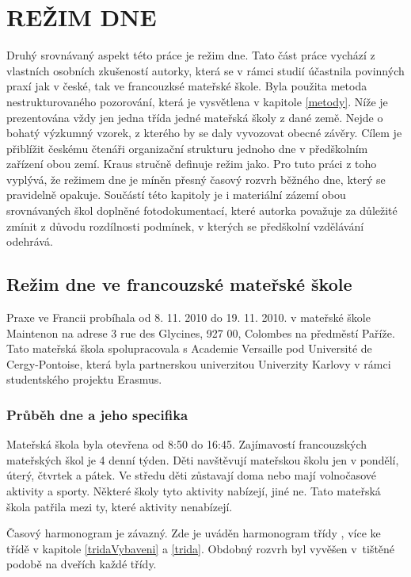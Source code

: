 \chapter{REŽIM DNE}
\label{rezim}

	Druhý srovnávaný aspekt této práce je režim dne. Tato část práce vychází z vlastních osobních zkušeností autorky, která se v rámci studií účastnila povinných praxí jak v české, tak ve francouzksé mateřské škole. Byla použita metoda nestrukturovaného pozorování, která je vysvětlena v kapitole \ref{metody}. Níže je prezentována vždy jen jedna třída jedné mateřská školy z dané země. Nejde o bohatý výzkumný vzorek, z kterého by se daly vyvozovat obecné závěry. Cílem je přiblížit českému čtenáři organizační strukturu jednoho dne v předškolním zařízení obou zemí. Kraus stručně definuje režim jako\textit{}. \citep[s.~700]{Kraus}
	Pro tuto práci z toho vyplývá, že režimem dne je míněn přesný časový rozvrh běžného dne, který se pravidelně opakuje.
	Součástí této kapitoly je i materiální zázemí obou srovnávaných škol doplněné fotodokumentací, které autorka považuje za důležité zmínit z důvodu rozdílnosti podmínek, v kterých se předškolní vzdělávání odehrává.

	\section{Režim dne ve francouzské mateřské škole}

		Praxe ve Francii probíhala od 8. 11. 2010 do 19. 11. 2010. v mateřské škole Maintenon na adrese 3 rue des Glycines, 927 00, Colombes na předměstí Paříže. Tato mateřská škola spolupracovala s Academie Versaille pod Université de Cergy-Pontoise, která byla partnerskou univerzitou Univerzity Karlovy v rámci studentského projektu Erasmus. 


		\subsection{Průběh dne a jeho specifika}

			Mateřská škola byla otevřena od 8:50 do 16:45. Zajímavostí francouzských mateřských škol je 4 denní týden. Děti navštěvují mateřskou školu jen v pondělí, úterý, čtvrtek a pátek. Ve středu děti zůstavají doma nebo mají volnočasové aktivity a sporty. Některé školy tyto aktivity nabízejí, jiné ne. Tato mateřská škola patřila mezi ty, které aktivity nenabízejí. 
			
			Časový harmonogram je závazný. Zde je uváděn harmonogram třídy , více ke třídě v kapitole \ref{tridaVybaveni} a \ref{trida}. Obdobný rozvrh byl vyvěšen v tištěné podobě na dveřích každé třídy. 

